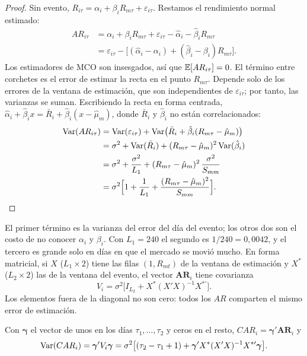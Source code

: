 \begin{proof}
Sin evento, $R_{i\tau}=\alpha_i+\beta_iR_{m\tau}+\varepsilon_{i\tau}$. Restamos el rendimiento normal estimado:
\begin{align*}
  AR_{i\tau} &= \alpha_i+\beta_iR_{m\tau}+\varepsilon_{i\tau}-\hat\alpha_i-\hat\beta_iR_{m\tau}\\
             &= \varepsilon_{i\tau}-\bigl[(\hat\alpha_i-\alpha_i)+(\hat\beta_i-\beta_i)R_{m\tau}\bigr].
\end{align*}
Los estimadores de MCO son insesgados, así que $\mathbb{E}[AR_{i\tau}]=0$. El término entre corchetes es el error de estimar la
recta en el punto $R_{m\tau}$. Depende solo de los errores de la ventana de estimación, que son independientes de
$\varepsilon_{i\tau}$; por tanto, las varianzas se suman. Escribiendo la recta en forma centrada,
$\hat\alpha_i+\hat\beta_ix=\bar R_i+\hat\beta_i(x-\hat\mu_m)$, donde $\bar R_i$ y $\hat\beta_i$ no están correlacionados:
\begin{align*}
  \operatorname{Var}(AR_{i\tau}) &= \operatorname{Var}(\varepsilon_{i\tau})+\operatorname{Var}\bigl(\bar R_i+\hat\beta_i(R_{m\tau}-\hat\mu_m)\bigr)\\
                   &= \sigma^2+\operatorname{Var}(\bar R_i)+(R_{m\tau}-\hat\mu_m)^2\operatorname{Var}(\hat\beta_i)\\
                   &= \sigma^2+\frac{\sigma^2}{L_1}+(R_{m\tau}-\hat\mu_m)^2\,\frac{\sigma^2}{S_{mm}}\\
                   &= \sigma^2\Bigl[1+\frac1{L_1}+\frac{(R_{m\tau}-\hat\mu_m)^2}{S_{mm}}\Bigr].
\end{align*}
\end{proof}

El primer término es la varianza del error del día del evento; los otros dos son el costo de no conocer $\alpha_i$ y
$\beta_i$. Con $L_1=240$ el segundo es $1/240=0{,}0042$, y el tercero es grande solo en días en que el mercado se movió mucho.
En forma matricial, si $X$ ($L_1\times2$) tiene las filas $(1,R_{mt})$ de la ventana de estimación y $X^*$ ($L_2\times2$) las
de la ventana del evento, el vector $\mathbf{AR}_i$ tiene covarianza
\[
  V_i=\sigma^2\bigl[I_{L_2}+X^*(X'X)^{-1}X^{*\prime}\bigr].
\]
Los elementos fuera de la diagonal no son cero: todos los $AR$ comparten el mismo error de estimación.

\begin{corolario}\label{cor:varcar}
Con $\boldsymbol\gamma$ el vector de unos en los días $\tau_1,\dots,\tau_2$ y ceros en el resto, $CAR_i=\boldsymbol\gamma'\mathbf{AR}_i$ y
\[
  \operatorname{Var}(CAR_i)=\boldsymbol\gamma'V_i\boldsymbol\gamma=\sigma^2\bigl[(\tau_2-\tau_1+1)+\boldsymbol\gamma'X^*(X'X)^{-1}X^{*\prime}\boldsymbol\gamma\bigr].
\]
\end{corolario}

